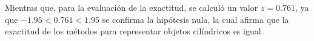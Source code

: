 Mientras que, para la evaluación de la exactitud,  se calculó un valor $z=0.761$, ya que $-1.95<0.761<1.95$ se confirma la hipótesis nula, la cual afirma que la exactitud de los métodos para representar objetos cilíndricos es igual.

%
%
%
%
%



